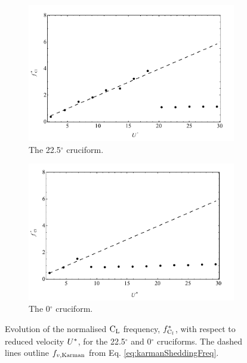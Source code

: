 \documentclass[oneside]{utmthesis}
\begin{document}
\begin{figure}
  \centering
  \begin{subfigure}[h]{1\textwidth}
    \includegraphics[width=\textwidth]{figs/clFreq2}
    \caption{The 22.5$^{\circ}$ cruciform.}
    \label{fig:clFreq2}
  \end{subfigure}
  
  \begin{subfigure}[h]{1\textwidth}
    \includegraphics[width=\textwidth]{figs/clFreq1}
    \caption{The 0$^{\circ}$ cruciform.}
    \label{fig:clFreq1}
  \end{subfigure}

  \label{fig:clFreq21}
  \caption{Evolution of the normalised $\text{C}_{\text{L}}$ frequency, $f_{\text{C}_{l}}^{*}$, with respect to reduced velocity $U^{*}$, for the 22.5$^{\circ}$ and 0$^{\circ}$ cruciforms. The dashed lines outline $f_{v,\text{Karman}}$ from Eq. \ref{eq:karmanSheddingFreq}.}
\end{figure}
\end{document}
